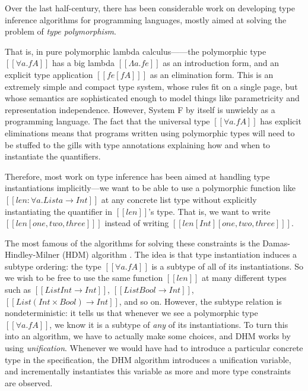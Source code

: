 Over the last half-century, there has been considerable work on developing type
inference algorithms for programming languages,  mostly aimed at solving the
problem of \emph{type polymorphism}.

That is, in pure polymorphic lambda
calculus---\systemf\cite{girard-system-f,jcr-system-f}---the polymorphic type
$[[∀a.fA]]$ has a big lambda $[[Λa.fe]]$ as an introduction form, and an
explicit type application $[[ fe[fA] ]]$ as an elimination form. This is an
extremely simple and compact type system, whose rules fit on a single page, but
whose semantics are sophisticated enough to model things like parametricity and
representation independence. However, System F by itself is unwieldy as a
programming language. The fact that the universal type $[[∀a.fA]]$ has explicit
eliminations means that programs written using polymorphic types will need to be
stuffed to the gills with type annotations explaining how and when to
instantiate the quantifiers.

Therefore, most work on type inference has been aimed at handling type
instantiations implicitly---we want to be able to use a polymorphic function
like $[[len : ∀a.List a → Int]]$ at any concrete list type without explicitly
instantiating the quantifier in $[[len]]$'s type. That is, we want to write
$[[ len [one,two,three] ]]$ instead of writing
$[[ len [Int] [one,two,three] ]]$.

The most famous of the algorithms for solving these constraints is the
Damas-Hindley-Milner (HDM) algorithm
\cite{hindley69:principal,milner78:theory,damas82:principal}. The idea is that
type instantiation induces a subtype ordering: the type $[[∀a.fA]]$ is a subtype
of all of its instantiations. So we wish to be free to use the same function
$[[len]]$ at many different types such as 
$[[List Int → Int]]$, $[[List Bool → Int]]$,
$[[List (Int × Bool) → Int]]$, and so on.
However, the subtype relation is nondeterministic: it tells us that whenever we
see a polymorphic type $[[∀a.fA]]$, we know it is a subtype of \emph{any}
of its instantiations. To turn this into an algorithm, we have to actually make
some choices, and DHM works by using \emph{unification}. Whenever we would have
had to introduce a particular concrete type in the specification, the DHM
algorithm introduces a unification variable, and incrementally instantiates this
variable as more and more type constraints are observed.


                 


